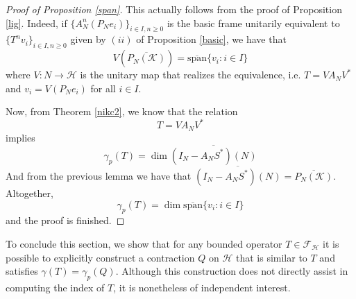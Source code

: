 \documentclass[a4paper,12pt]{amsart}
\def\cF{{\mathcal{F}}}
\def\HH{{\mathcal{H}}}
\def\KK{{\mathcal{K}}}
\def\cF{{\mathcal{F}}}
\def\osp{{\overline{\textrm{span}}}}
\theoremstyle{definition}
\begin{document}
\begin{proof}[Proof of Proposition \ref{span}]
This actually follows from the proof of Proposition \ref{lig}. Indeed, if $\{A_N^n(P_Ne_i)\}_{i\in I,n\geqslant0}$ is the basic frame unitarily equivalent to $\{T^nv_i\}_{i\in I,n\geqslant0}$ given by $(ii)$ of Proposition \ref{basic}, we have that
\begin{equation*}
V(\overline{P_N(\KK)})=\osp\{v_i:i\in I\}
\end{equation*}
where $V:N\to\HH$ is the unitary map that realizes the equivalence, i.e. $T=VA_NV^*$ and $v_i=V(P_Ne_i)$ for all $i\in I$.


Now, from Theorem \ref{nikc2}, we know that the relation $$T=VA_NV^*$$ implies
\begin{equation*}
\gamma_p(T)=\dim\overline{(I_N-A_NS^*)(N)}
\end{equation*}
And from the previous lemma we have that $\overline{(I_N-A_NS^*)(N)}=\overline{P_N(\KK)}$. Altogether, 
\begin{equation*}
\gamma_p(T)=\dim\osp\{v_i:i\in I\}
\end{equation*}
and the proof is finished.
\end{proof}

To conclude this section, we show that for any bounded operator 
$T\in\cF_{\HH}$ it is possible to explicitly construct a contraction 
$Q$ on $\HH$ that is similar to $T$ and satisfies $\gamma(T)=\gamma_p(Q)$. 
Although this construction does not directly assist in computing the index 
of $T$, it is nonetheless of independent interest.
\end{document}

